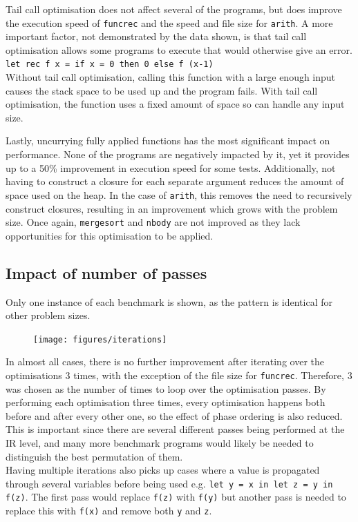Tail call optimisation does not affect several of the programs, but does improve the execution speed of \verb|funcrec| and the speed and file size for \verb|arith|. A more important factor, not demonstrated by the data shown, is that tail call optimisation allows some programs to execute that would otherwise give an error. \\
\verb|let rec f x = if x = 0 then 0 else f (x-1)| \\
Without tail call optimisation, calling this function with a large enough input causes the stack space to be used up and the program fails. With tail call optimisation, the function uses a fixed amount of space so can handle any input size.

Lastly, uncurrying fully applied functions has the most significant impact on performance. None of the programs are negatively impacted by it, yet it provides up to a 50\% improvement in execution speed for some tests. Additionally, not having to construct a closure for each separate argument reduces the amount of space used on the heap. In the case of \verb|arith|, this removes the need to recursively construct closures, resulting in an improvement which grows with the problem size. Once again, \verb|mergesort| and \verb|nbody| are not improved as they lack opportunities for this optimisation to be applied.


\subsection{Impact of number of passes}
Only one instance of each benchmark is shown, as the pattern is identical for other problem sizes.

\begin{figure}[H]
\hspace{-1cm}
\texttt{[image: figures/iterations]}
 \label{fig:iterations} 
\end{figure}

In almost all cases, there is no further improvement after iterating over the optimisations 3 times, with the exception of the file size for \verb|funcrec|. Therefore, 3 was chosen as the number of times to loop over the optimisation passes. By performing each optimisation three times, every optimisation happens both before and after every other one, so the effect of phase ordering is also reduced. This is important since there are several different passes being performed at the IR level, and many more benchmark programs would likely be needed to distinguish the best permutation of them.\\
Having multiple iterations also picks up cases where a value is propagated through several variables before being used e.g. \verb|let y = x in let z = y in f(z)|. The first pass would replace \verb|f(z)| with \verb|f(y)| but another pass is needed to replace this with \verb|f(x)| and remove both \verb|y| and \verb|z|.

